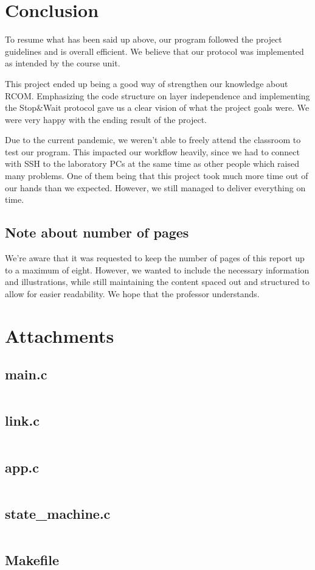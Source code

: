 \documentclass[11pt]{report}
\begin{document}
\chapter{Conclusion}

To resume what has been said up above, our program followed the project guidelines and is overall efficient. We believe that our protocol was implemented as intended by the course unit.

This project ended up being a good way of strengthen our knowledge about RCOM. Emphasizing the code structure on layer independence and implementing the Stop\&Wait protocol gave us a clear vision of what the project goals were. We were very happy with the ending result of the project.

Due to the current pandemic, we weren't able to freely attend the classroom to test our program. This impacted our workflow heavily, since we had to connect with SSH to the laboratory PCs at the same time as other people which raised many problems. One of them being that this project took much more time out of our hands than we expected. However, we still managed to deliver everything on time.

\section{Note about number of pages}
We're aware that it was requested to keep the number of pages of this report up to a maximum of eight. However, we wanted to include the necessary information and illustrations, while still maintaining the content spaced out and structured to allow for easier readability. 
We hope that the professor understands.

\chapter{Attachments}

\section{main.c}

\inputminted[breaklines]{c}{../src/main.c}

\newpage

\section{link.c}

\inputminted[breaklines]{c}{../src/link.c}
\newpage

\section{app.c}

\inputminted[breaklines]{c}{../src/app.c}
\newpage

\section{state\_machine.c}

\inputminted[breaklines]{c}{../src/state_machine.c}
\newpage

\section{Makefile}

\inputminted[breaklines]{make}{../src/Makefile}
\newpage
\end{document}
